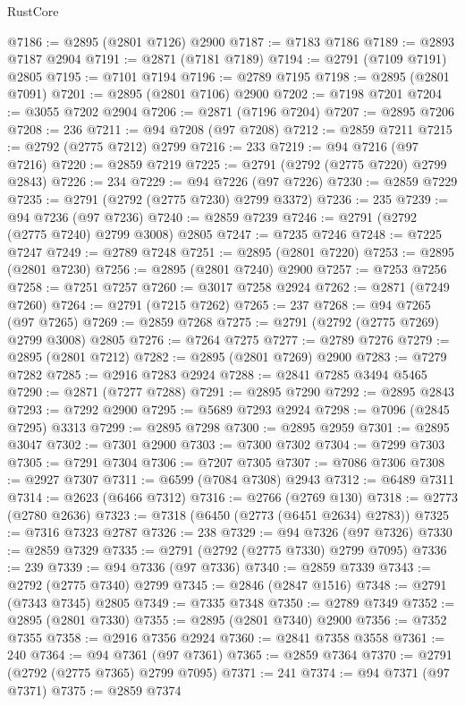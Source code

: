 \begin{lexlean}{RustCore}
\begin{coremodule}
@7186 := @2895 (@2801 @7126) @2900
@7187 := @7183 @7186
@7189 := @2893 @7187 @2904
@7191 := @2871 (@7181 @7189)
@7194 := @2791 (@7109 @7191) @2805
@7195 := @7101 @7194
@7196 := @2789 @7195
@7198 := @2895 (@2801 @7091)
@7201 := @2895 (@2801 @7106) @2900
@7202 := @7198 @7201
@7204 := @3055 @7202 @2904
@7206 := @2871 (@7196 @7204)
@7207 := @2895 @7206
@7208 := 236
@7211 := @94 @7208 (@97 @7208)
@7212 := @2859 @7211
@7215 := @2792 (@2775 @7212) @2799
@7216 := 233
@7219 := @94 @7216 (@97 @7216)
@7220 := @2859 @7219
@7225 := @2791 (@2792 (@2775 @7220) @2799 @2843)
@7226 := 234
@7229 := @94 @7226 (@97 @7226)
@7230 := @2859 @7229
@7235 := @2791 (@2792 (@2775 @7230) @2799 @3372)
@7236 := 235
@7239 := @94 @7236 (@97 @7236)
@7240 := @2859 @7239
@7246 := @2791 (@2792 (@2775 @7240) @2799 @3008) @2805
@7247 := @7235 @7246
@7248 := @7225 @7247
@7249 := @2789 @7248
@7251 := @2895 (@2801 @7220)
@7253 := @2895 (@2801 @7230)
@7256 := @2895 (@2801 @7240) @2900
@7257 := @7253 @7256
@7258 := @7251 @7257
@7260 := @3017 @7258 @2924
@7262 := @2871 (@7249 @7260)
@7264 := @2791 (@7215 @7262)
@7265 := 237
@7268 := @94 @7265 (@97 @7265)
@7269 := @2859 @7268
@7275 := @2791 (@2792 (@2775 @7269) @2799 @3008) @2805
@7276 := @7264 @7275
@7277 := @2789 @7276
@7279 := @2895 (@2801 @7212)
@7282 := @2895 (@2801 @7269) @2900
@7283 := @7279 @7282
@7285 := @2916 @7283 @2924
@7288 := @2841 @7285 @3494 @5465
@7290 := @2871 (@7277 @7288)
@7291 := @2895 @7290
@7292 := @2895 @2843
@7293 := @7292 @2900
@7295 := @5689 @7293 @2924
@7298 := @7096 (@2845 @7295) @3313
@7299 := @2895 @7298
@7300 := @2895 @2959
@7301 := @2895 @3047
@7302 := @7301 @2900
@7303 := @7300 @7302
@7304 := @7299 @7303
@7305 := @7291 @7304
@7306 := @7207 @7305
@7307 := @7086 @7306
@7308 := @2927 @7307
@7311 := @6599 (@7084 @7308) @2943
@7312 := @6489 @7311
@7314 := @2623 (@6466 @7312)
@7316 := @2766 (@2769 @130)
@7318 := @2773 (@2780 @2636)
@7323 := @7318 (@6450 (@2773 (@6451 @2634) @2783))
@7325 := @7316 @7323 @2787
@7326 := 238
@7329 := @94 @7326 (@97 @7326)
@7330 := @2859 @7329
@7335 := @2791 (@2792 (@2775 @7330) @2799 @7095)
@7336 := 239
@7339 := @94 @7336 (@97 @7336)
@7340 := @2859 @7339
@7343 := @2792 (@2775 @7340) @2799
@7345 := @2846 (@2847 @1516)
@7348 := @2791 (@7343 @7345) @2805
@7349 := @7335 @7348
@7350 := @2789 @7349
@7352 := @2895 (@2801 @7330)
@7355 := @2895 (@2801 @7340) @2900
@7356 := @7352 @7355
@7358 := @2916 @7356 @2924
@7360 := @2841 @7358 @3558
@7361 := 240
@7364 := @94 @7361 (@97 @7361)
@7365 := @2859 @7364
@7370 := @2791 (@2792 (@2775 @7365) @2799 @7095)
@7371 := 241
@7374 := @94 @7371 (@97 @7371)
@7375 := @2859 @7374

\end{coremodule}
\end{lexlean}
